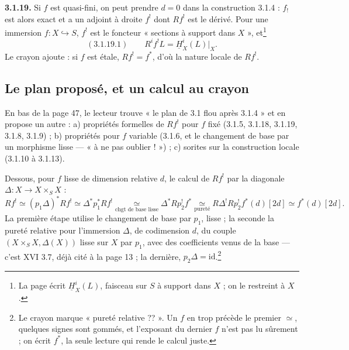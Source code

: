 \documentclass[11pt,a4paper]{article}
\begin{document}
\textbf{3.1.19.} Si $f$ est quasi-fini, on peut prendre $d = 0$ dans la
construction 3.1.4 : $f_!$ est alors exact et a un adjoint à droite $f^!$ dont
$Rf^!$ est le dérivé. Pour une immersion $f\colon X \hookrightarrow S$, $f^!$
est le foncteur « sections à support dans $X$ », et\footnote{La page écrit $\underline{H}^i_X(L)$, faisceau sur $S$ à support
dans $X$ ; on le restreint à $X$.}
\[
(3.1.19.1)\qquad R^if^!L = \underline{H}^i_X(L)\big|_X.
\]
Le crayon ajoute : si $f$ est étale,
$Rf^! = f^*$, d'où la nature locale de $Rf^!$.

\subsection*{Le plan proposé, et un calcul au crayon}

En bas de la page 47, le lecteur trouve « le plan de 3.1 flou après 3.1.4 »
et en propose un autre : a) propriétés formelles de $Rf^!$ pour $f$ fixé
(3.1.5, 3.1.18, 3.1.19, 3.1.8, 3.1.9) ; b) propriétés pour $f$ variable
(3.1.6, et le changement de base par un morphisme lisse --- « à ne pas
oublier ! ») ; c) sorites sur la construction locale (3.1.10 à 3.1.13).

Dessous, pour $f$ lisse de dimension relative $d$, le calcul de $Rf^!$ par
la diagonale $\Delta\colon X \to X \times_S X$ :
\[
Rf^! \simeq (p_1\Delta)^*Rf^! \simeq \Delta^*p_1^*Rf^!
\underset{\text{chgt de base lisse}}{\simeq} \Delta^*Rp_2^!f^*
\underset{\text{pureté}}{\simeq} R\Delta^!Rp_2^!f^*(d)[2d] \simeq f^*(d)[2d].
\]
La première étape utilise le changement de base par $p_1$, lisse ; la seconde
la pureté relative pour l'immersion $\Delta$, de codimension $d$, du couple
$(X \times_S X, \Delta(X))$ lisse sur $X$ par $p_1$, avec des coefficients
venus de la base --- c'est XVI 3.7, déjà cité à la page 13 ; la dernière,
$p_2\Delta = \mathrm{id}$.\footnote{Le crayon marque « pureté relative ?? ».
Un $f$ en trop précède le premier $\simeq$, quelques signes sont gommés, et
l'exposant du dernier $f$ n'est pas lu sûrement ; on écrit $f^*$, la seule
lecture qui rende le calcul juste.}
\end{document}
